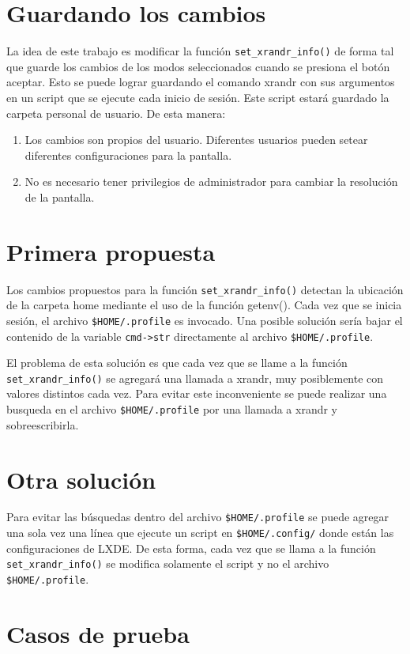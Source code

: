 \documentclass[final,narroweqnarray,inline,twoside]{ieee}
\begin{document}
\section{Guardando los cambios}
La idea de este trabajo es modificar la función \texttt{set\_xrandr\_info()} de forma tal que guarde los cambios de los modos
seleccionados cuando se presiona el botón aceptar. Esto se puede lograr guardando el comando xrandr con sus argumentos en un
script que se ejecute cada inicio de sesión. Este script estará guardado la carpeta personal de usuario. De esta manera:
\begin{enumerate}
 \item Los cambios son propios del usuario. Diferentes usuarios pueden setear diferentes configuraciones para la pantalla.
 \item No es necesario tener privilegios de administrador para cambiar la resolución de la pantalla.
\end{enumerate}


\section{Primera propuesta}
Los cambios propuestos para la función \texttt{set\_xrandr\_info()} detectan la ubicación de la carpeta home mediante el uso
de la función getenv(). Cada vez que se inicia sesión, el archivo \texttt{\$HOME/.profile} es invocado. Una posible solución
sería bajar el contenido de la variable \texttt{cmd->str} directamente al archivo \texttt{\$HOME/.profile}. 

El problema de esta solución es que cada vez que se llame a la función \texttt{set\_xrandr\_info()} se agregará una llamada
a xrandr, muy posiblemente con valores distintos cada vez. Para evitar este inconveniente se puede realizar una busqueda en
el archivo \texttt{\$HOME/.profile} por una llamada a xrandr y sobreescribirla.

\section{Otra solución}
Para evitar las búsquedas dentro del archivo \texttt{\$HOME/.profile} se puede agregar una sola vez una línea que ejecute un
script en \texttt{\$HOME/.config/} donde están las configuraciones de LXDE. De esta forma, cada vez que se llama a la función
\texttt{set\_xrandr\_info()} se modifica solamente el script y no el archivo \texttt{\$HOME/.profile}.


\section{Casos de prueba}
\end{document}
